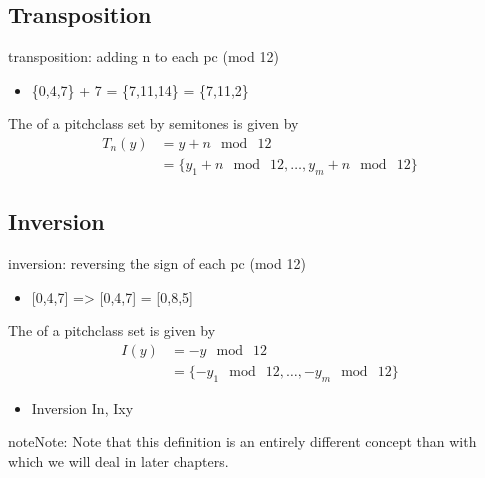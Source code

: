 \documentclass[letterpaper,10pt,english]{sphinxmanual}
\begin{document}
\subsection{Transposition}
\label{\detokenize{1_fundamentals:transposition}}
transposition: adding n to each pc (mod 12)
\begin{itemize}
\item {} 
\{0,4,7\} + 7 = \{7,11,14\} = \{7,11,2\}

\end{itemize}

The  of a pitch\sphinxhyphen{}class set  by  semitones is given by
\begin{equation*}
\begin{split}T_n(y) &= y + n\mod~12\\
       &= \{y_1 + n\mod~12, \ldots, y_m + n\mod~12\}\end{split}
\end{equation*}

\subsection{Inversion}
\label{\detokenize{1_fundamentals:inversion}}
inversion: reversing the sign of each pc (mod 12)
\begin{itemize}
\item {} 
{[}0,4,7{]} =\textgreater{} {[}0,\sphinxhyphen{}4,\sphinxhyphen{}7{]} = {[}0,8,5{]}

\end{itemize}

The  of a pitch\sphinxhyphen{}class set  is given by
\begin{equation*}
\begin{split}I(y) &= -y\mod~12 \\
     &= \{-y_1\mod~12, \ldots,-y_m\mod~12\}\end{split}
\end{equation*}\begin{itemize}
\item {} 
Inversion In, Ixy

\end{itemize}

\begin{sphinxadmonition}{note}{Note:}
Note that this definition is an entirely different concept
than  with which we will deal in later chapters.
\end{sphinxadmonition}
\end{document}
